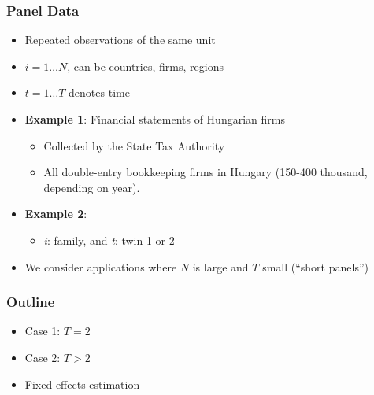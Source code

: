 \documentclass[notes=show,beamer,compress]{beamer}
\begin{document}
\begin{frame}
\frametitle{Panel Data}


\begin {itemize}
\item Repeated observations of the same unit

\item  $i=1\ldots N$, can be countries, firms, regions
\item $t= 1\ldots T$ denotes time

\item \textbf{Example 1}: Financial statements of Hungarian firms

\begin {itemize}
\item Collected by the State Tax Authority
\item All double-entry bookkeeping firms in Hungary (150-400 thousand, depending on year).
\end{itemize}

\item \textbf{Example 2}:

\begin {itemize}
\item \textit{i}: family, and \textit{t}: twin 1 or 2
\end{itemize}

\item We consider applications where $N$ is large and $T$ small (``short panels'')

\end{itemize}
\end{frame}


\begin{frame}
\frametitle{Outline}

\begin{itemize}
  \item Case 1: $T=2$
  \item Case 2: $T>2$
  \item Fixed effects estimation
\end{itemize}
\end{frame}



\end{document}
